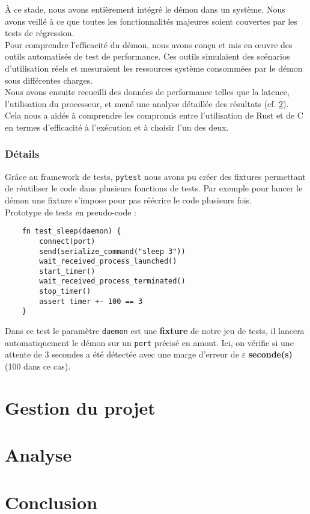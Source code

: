 \documentclass{article}
\begin{document}
À ce stade, nous avons entièrement intégré le démon dans un système. Nous avons veillé à ce que toutes les fonctionnalités majeures soient couvertes par les tests de régression.\\

Pour comprendre l’efficacité du démon, nous avons conçu et mis en œuvre des outils automatisés de test de performance. Ces outils simulaient des scénarios d’utilisation réels et mesuraient les ressources système consommées par le démon sous différentes charges.\\

Nous avons ensuite recueilli des données de performance telles que la latence, l’utilisation du processeur, et mené une analyse détaillée des résultats (cf. \ref{sec:analyse}). Cela nous a aidés à comprendre les compromis entre l'utilisation de Rust et de C en termes d’efficacité à l'exécution et à choisir l’un des deux.

\subsubsection{Détails}

Grâce au framework de tests, \texttt{pytest} nous avons pu créer des fixtures permettant de réutiliser le code dans plusieurs fonctions de tests. Par exemple pour lancer le démon une fixture s'impose pour pas réécrire le code plusieurs fois.\\

Prototype de tests en pseudo-code : 

\begin{verbatim}
    fn test_sleep(daemon) {
        connect(port)
        send(serialize_command("sleep 3"))
        wait_received_process_launched()
        start_timer()
        wait_received_process_terminated()
        stop_timer()
        assert timer +- 100 == 3
    }
\end{verbatim}

Dans ce test le paramètre \texttt{daemon} est une \textbf{fixture} de notre jeu de tests, il lancera automatiquement le démon sur un \texttt{port} précisé en amont. Ici, on vérifie si une attente de 3 secondes a été détectée avec une marge d’erreur de $\varepsilon$ \textbf{seconde(s)} (100 dans ce cas).


\section{Gestion du projet}


\section{Analyse}
\label{sec:analyse}


\section{Conclusion}
\end{document}
